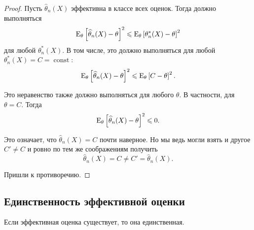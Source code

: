 \begin{proof}
    Пусть $\widehat{\theta}_n(X)$ эффективна в классе всех оценок. Тогда должно выполняться
    \begin{equation*}
        \operatorname{E}_{\theta} \left[ \widehat{\theta}_n(X) - \theta \right]^2 \leqslant \operatorname{E}_{\theta} \left[ \theta^*_n(X) - \theta \right]^2
    \end{equation*}
    для любой $\theta_n^*(X)$. В том числе, это должно выполняться для любой $\theta_n^*(X) = C = \operatorname{const}$:
    \begin{equation*}
        \operatorname{E}_{\theta} \left[ \widehat{\theta}_n(X) - \theta \right]^2 \leqslant \operatorname{E}_{\theta} \left[ C - \theta \right]^2.
    \end{equation*}

    Это неравенство также должно выполняться для любого $\theta$. В частности, для $\theta = C$. Тогда
    \begin{equation*}
        \operatorname{E}_{\theta} \left[ \widehat{\theta}_n(X) - \theta \right]^2 \leqslant 0.
    \end{equation*}

    Это означает, что $\widehat{\theta}_n(X) = C$ почти наверное. Но мы ведь могли взять и другое $C' \neq C$ и ровно по тем же соображениям получить
    \begin{equation*}
        \widehat{\theta}_n(X) = C \neq C' = \widehat{\theta}_n(X).
    \end{equation*}

    Пришли к противоречию.
\end{proof}

\subsection{Единственность эффективной оценки}

\begin{proposition*}
    Если эффективная оценка существует, то она единственная.
\end{proposition*}

